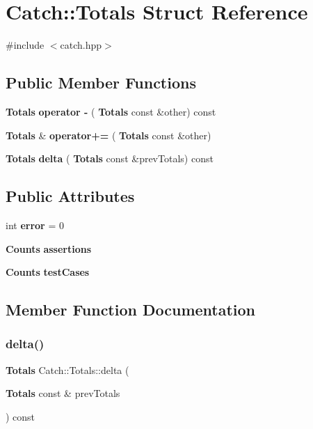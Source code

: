 \section{Catch\+::Totals Struct Reference}
\label{struct_catch_1_1_totals}


{\ttfamily \#include $<$catch.\+hpp$>$}

\subsection*{Public Member Functions}
\begin{DoxyCompactItemize}
\item 
\textbf{ Totals} \textbf{ operator -\/} (\textbf{ Totals} const \&other) const
\item 
\textbf{ Totals} \& \textbf{ operator+=} (\textbf{ Totals} const \&other)
\item 
\textbf{ Totals} \textbf{ delta} (\textbf{ Totals} const \&prev\+Totals) const
\end{DoxyCompactItemize}
\subsection*{Public Attributes}
\begin{DoxyCompactItemize}
\item 
int \textbf{ error} = 0
\item 
\textbf{ Counts} \textbf{ assertions}
\item 
\textbf{ Counts} \textbf{ test\+Cases}
\end{DoxyCompactItemize}


\subsection{Member Function Documentation}
\mbox{\label{struct_catch_1_1_totals_a1a94a654f5f3786b75695e081fc9bca2}} 
\subsubsection{delta()}
{\footnotesize\ttfamily \textbf{ Totals} Catch\+::\+Totals\+::delta (\begin{DoxyParamCaption}\item[{\textbf{ Totals} const \&}]{prev\+Totals }\end{DoxyParamCaption}) const}

